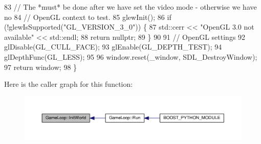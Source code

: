 \begin{DoxyCode}
83         \textcolor{comment}{// The *must* be done after we have set the video mode - otherwise we have no}
84         \textcolor{comment}{// OpenGL context to test.}
85         glewInit();
86         \textcolor{keywordflow}{if} (!glewIsSupported(\textcolor{stringliteral}{"GL\_VERSION\_3\_0"})) \{
87                 std::cerr << \textcolor{stringliteral}{"OpenGL 3.0 not available"} << std::endl;
88                 \textcolor{keywordflow}{return} \textcolor{keyword}{nullptr};
89         \}
90 
91         \textcolor{comment}{// OpenGL settings}
92         glDisable(GL\_CULL\_FACE);
93         glEnable(GL\_DEPTH\_TEST);
94         glDepthFunc(GL\_LESS);
95 
96         window.reset(\_window, SDL\_DestroyWindow);
97         \textcolor{keywordflow}{return} window;
98 \}
\end{DoxyCode}


Here is the caller graph for this function\+:\nopagebreak
\begin{figure}[H]
\begin{center}
\leavevmode
\includegraphics[width=350pt]{class_game_loop_afcbeaf01f4a6d443753ccabbadbec8d7_icgraph}
\end{center}
\end{figure}


\hypertarget{class_game_loop_a6d84f749fa38ca86039353245d77461c}{}
